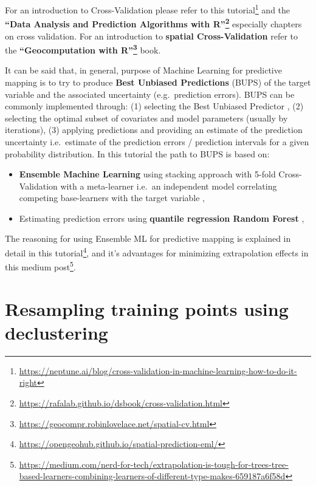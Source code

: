 \documentclass[
  graybox,natbib,nospthms]{svmono}
\providecommand{\tightlist}{%
  \setlength{\itemsep}{0pt}\setlength{\parskip}{0pt}}
\providecommand{\tightlist}{\setlength{\itemsep}{0pt}\setlength{\parskip}{0pt}}
\renewcommand{\href}[2]{#2 (\url{#1})}
\renewcommand{\href}[2]{#2\footnote{\url{#1}}}
\begin{document}
For an introduction to Cross-Validation please refer to \href{https://neptune.ai/blog/cross-validation-in-machine-learning-how-to-do-it-right}{this tutorial}
and the \textbf{\href{https://rafalab.github.io/dsbook/cross-validation.html}{``Data Analysis and Prediction Algorithms with R''}} especially chapters on cross validation.
For an introduction to \textbf{spatial Cross-Validation} refer to the \textbf{\href{https://geocompr.robinlovelace.net/spatial-cv.html}{``Geocomputation with R''}} book.

It can be said that, in general, purpose of Machine Learning for predictive
mapping is to try to produce \textbf{Best Unbiased Predictions} (BUPS) of the target
variable and the associated uncertainty (e.g.~prediction errors).
BUPS can be commonly implemented through: (1) selecting the Best Unbiased Predictor
\citep{Venables2002Springer}, (2) selecting the optimal subset of covariates and model
parameters (usually by iterations), (3) applying predictions and providing an
estimate of the prediction uncertainty i.e.~estimate of the prediction errors /
prediction intervals for a given probability distribution. In this tutorial the
path to BUPS is based on:

\begin{itemize}
\tightlist
\item
  \textbf{Ensemble Machine Learning} using stacking approach with 5-fold Cross-Validation
  with a meta-learner i.e.~an independent model correlating competing base-learners
  with the target variable \citep{polley2010super, bischl2016mlr},
\item
  Estimating prediction errors using \textbf{quantile regression Random Forest} \citep{lu2021unified},
\end{itemize}

The reasoning for using Ensemble ML for predictive mapping is explained in detail
in \href{https://opengeohub.github.io/spatial-prediction-eml/}{this tutorial}, and it's
advantages for minimizing extrapolation effects in this \href{https://medium.com/nerd-for-tech/extrapolation-is-tough-for-trees-tree-based-learners-combining-learners-of-different-type-makes-659187a6f58d}{medium post}.

\hypertarget{resampling-training-points-using-declustering}{%
\section{Resampling training points using declustering}\label{resampling-training-points-using-declustering}}
\end{document}
